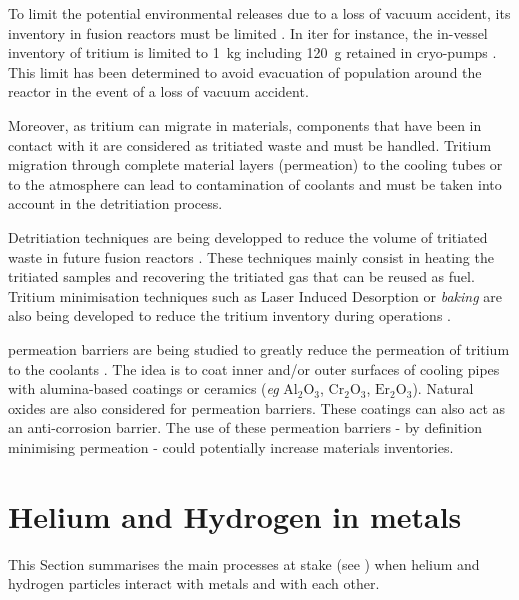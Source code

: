 To limit the potential environmental releases due to a loss of vacuum accident, its \gls{inventory} in fusion reactors must be limited .
In \acrshort{iter} for instance, the in-vessel \gls{inventory} of tritium is limited to \SI{1}{kg} including \SI{120}{g} retained in cryo-pumps .
This limit has been determined to avoid evacuation of population around the reactor in the event of a loss of vacuum accident.

Moreover, as tritium can migrate in materials, components that have been in contact with it are considered as tritiated waste and must be handled.
Tritium migration through complete material layers (\gls{permeation}) to the cooling tubes  or to the atmosphere can lead to contamination of coolants and must be taken into account in the detritiation process.

Detritiation techniques are being developped to reduce the volume of tritiated waste in future fusion reactors .
These techniques mainly consist in heating the tritiated samples and recovering the tritiated gas  that can be reused as fuel.
Tritium minimisation techniques such as Laser Induced Desorption or \emph{baking} are also being developed to reduce the tritium \gls{inventory} during operations .

\Gls{permeation} barriers are being studied to greatly reduce the \gls{permeation} of tritium to the coolants .
The idea is to coat inner and/or outer surfaces of cooling pipes with alumina-based coatings or ceramics (\textit{eg} $\mathrm{Al_2 O_3}$, $\mathrm{Cr_2 O_3}$, $\mathrm{Er_2 O_3}$).
Natural oxides are also considered for \gls{permeation} barriers.
These coatings can also act as an anti-corrosion barrier.
The use of these \gls{permeation} barriers - by definition minimising \gls{permeation} - could potentially increase materials inventories.

\section{Helium and Hydrogen in metals}

This Section summarises the main processes at stake (see ) when helium and hydrogen particles interact with metals and with each other.

